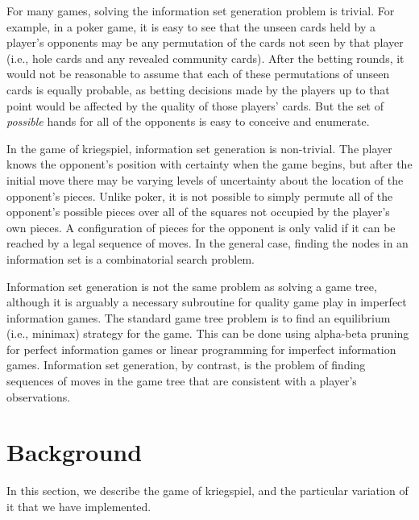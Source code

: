 \documentclass[11pt]{article}
\begin{document}
For many games, solving the information set generation problem is trivial.  For example, in a poker game, it is easy to
see that the unseen cards held by a player's opponents may be any permutation of the cards not seen by that player
(i.e., hole cards and any revealed community cards).  After the betting rounds, it would not be reasonable to assume
that each of these permutations of unseen cards is equally probable, as betting decisions made by the players up to that
point would be affected by the quality of those players' cards.  But the set of {\em possible} hands for all of the
opponents is easy to conceive and enumerate.

In the game of kriegspiel, information set generation is non-trivial.  The player knows the opponent's position with
certainty when the game begins, but after the initial move there may be varying levels of uncertainty about the location
of the opponent's pieces.  Unlike poker, it is not possible to simply permute all of the opponent's possible pieces over
all of the squares not occupied by the player's own pieces.  A configuration of pieces for the opponent is only valid if
it can be reached by a legal sequence of moves.  In the general case, finding the nodes in an information set is a
combinatorial search problem.

Information set generation is not the same problem as solving a game
tree, although it is arguably a necessary subroutine for quality game play in imperfect information games. The standard
game tree problem is to find an equilibrium (i.e., minimax) strategy for the game. This can be done using alpha-beta
pruning for perfect information games or linear programming for imperfect information games. Information set generation,
by contrast, is the problem of finding sequences of moves in the game tree that are consistent with a player's
observations.

\section{Background}
In this section, we describe the game of kriegspiel, and the particular variation of it that we have implemented.
\end{document}
